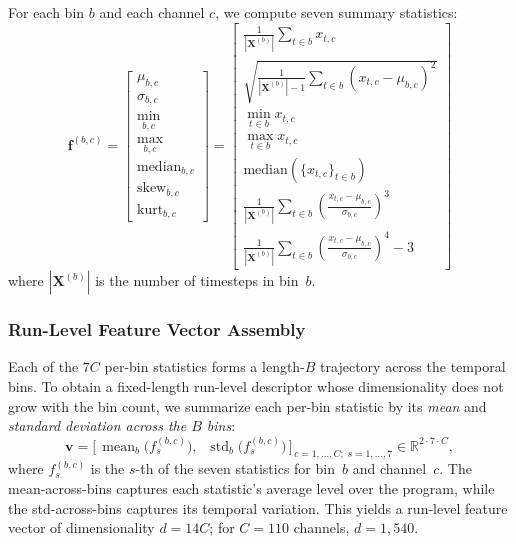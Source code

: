 For each bin $b$ and each channel $c$, we compute seven summary statistics:
\begin{equation}
    \mathbf{f}^{(b,c)} = \begin{bmatrix}
        \mu_{b,c} \\[2pt] \sigma_{b,c} \\[2pt] \min_{b,c} \\[2pt] \max_{b,c} \\[2pt] \text{median}_{b,c} \\[2pt] \text{skew}_{b,c} \\[2pt] \text{kurt}_{b,c}
    \end{bmatrix}
    = \begin{bmatrix}
        \frac{1}{|\mathbf{X}^{(b)}|} \sum_{t \in b} x_{t,c} \\[4pt]
        \sqrt{\frac{1}{|\mathbf{X}^{(b)}|-1} \sum_{t \in b} (x_{t,c} - \mu_{b,c})^2} \\[4pt]
        \min_{t \in b} x_{t,c} \\[4pt]
        \max_{t \in b} x_{t,c} \\[4pt]
        \text{median}(\{x_{t,c}\}_{t \in b}) \\[4pt]
        \frac{1}{|\mathbf{X}^{(b)}|} \sum_{t \in b} \left(\frac{x_{t,c} - \mu_{b,c}}{\sigma_{b,c}}\right)^3 \\[4pt]
        \frac{1}{|\mathbf{X}^{(b)}|} \sum_{t \in b} \left(\frac{x_{t,c} - \mu_{b,c}}{\sigma_{b,c}}\right)^4 - 3
    \end{bmatrix}
\end{equation}
where $|\mathbf{X}^{(b)}|$ is the number of timesteps in bin~$b$.

\subsubsection{Run-Level Feature Vector Assembly}

Each of the $7C$ per-bin statistics forms a length-$B$ trajectory across the temporal bins. To obtain a fixed-length run-level descriptor whose dimensionality does not grow with the bin count, we summarize each per-bin statistic by its \emph{mean} and \emph{standard deviation across the $B$ bins}:
\begin{equation}\label{eq:feature_vector}
    \mathbf{v} = \Big[\, \operatorname{mean}_{b}\big(f^{(b,c)}_s\big),\;\; \operatorname{std}_{b}\big(f^{(b,c)}_s\big) \,\Big]_{\,c=1,\ldots,C;\; s=1,\ldots,7} \in \mathbb{R}^{2 \cdot 7 \cdot C},
\end{equation}
where $f^{(b,c)}_s$ is the $s$-th of the seven statistics for bin~$b$ and channel~$c$. The mean-across-bins captures each statistic's average level over the program, while the std-across-bins captures its temporal variation. This yields a run-level feature vector of dimensionality $d = 14C$; for $C = 110$ channels, $d = 1{,}540$.

